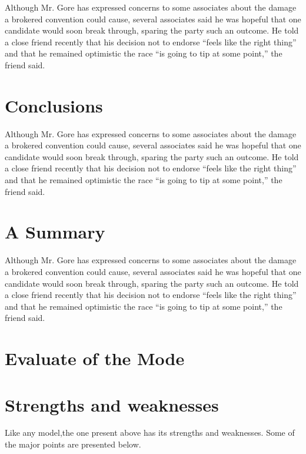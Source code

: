 Although Mr. Gore has expressed concerns to some associates about
the damage a brokered convention could cause, several associates
said he was hopeful that one candidate would soon break through,
sparing the party such an outcome. He told a close friend recently
that his decision not to endorse ``feels like the right thing''
and that he remained optimistic the race ``is going to tip at some
point,'' the friend said.

\section{Conclusions}
Although Mr. Gore has expressed concerns to some associates about
the damage a brokered convention could cause, several associates
said he was hopeful that one candidate would soon break through,
sparing the party such an outcome. He told a close friend recently
that his decision not to endorse ``feels like the right thing''
and that he remained optimistic the race ``is going to tip at some
point,'' the friend said.
\section{A Summary    }
Although Mr. Gore has expressed concerns to some associates about
the damage a brokered convention could cause, several associates
said he was hopeful that one candidate would soon break through,
sparing the party such an outcome. He told a close friend recently
that his decision not to endorse ``feels like the right thing''
and that he remained optimistic the race ``is going to tip at some
point,'' the friend said.
\section{Evaluate of the Mode}

\section{Strengths and weaknesses}
Like any model,the one present above has its strengths and
weaknesses. Some of the major points are presented below.


